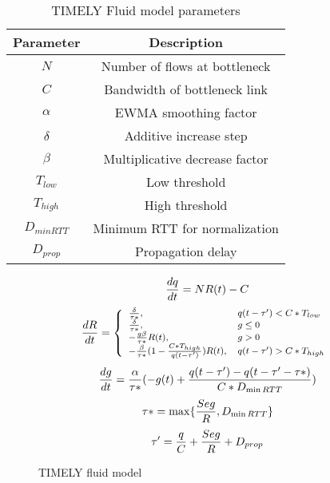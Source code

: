 \begin{table}[t]
\center
{
\footnotesize
{
\begin{tabular}{|c|c|} \hline
Parameter & Description \\ \hline
$N$ & Number of flows at bottleneck\\ \hline
$C$ & Bandwidth of bottleneck link\\ \hline
$\alpha$ & EWMA smoothing factor\\ \hline
$\delta$ & Additive increase step\\ \hline
$\beta$ & Multiplicative decrease factor\\ \hline
$T_{low}$ & Low threshold\\ \hline
$T_{high}$ & High threshold\\ \hline
$D_{minRTT}$ & Minimum RTT for normalization \\ \hline
$D_{prop}$ & Propagation delay \\ \hline
\end{tabular}
}
}
\caption{TIMELY Fluid model parameters}
\label{tab:timely_param}
\end{table}

\begin{figure}[h]
\fbox
{
\begin{minipage}{\columnwidth}
\begin{equation}
\small
\frac{{dq}}{{dt}} = NR(t) - C\\
\label{eq:timely_q}
\end{equation}
\begin{equation}
\small
\frac{{dR}}{{dt}} = \left\{ \begin{array}{ll}
\frac{\delta }{{\tau *}}, & q(t - \tau ') < C*{T_{low}}\\
\frac{\delta }{{\tau *}}, & g \le 0\\
 - \frac{{g\beta }}{{\tau *}}R(t), & g > 0\\
 - \frac{\beta }{{\tau *}}(1 - \frac{{C*{T_{high}}}}{{q(t - \tau ')}})R(t), & q(t - \tau ') > C*{T_{high}}
\end{array} \right.\\
\label{eq:timely_r}
\end{equation}
\begin{equation}
\small
\frac{{dg}}{{dt}} = \frac{\alpha }{{\tau *}}( - g(t) + \frac{{q(t - \tau ') - q(t - \tau ' - \tau *)}}{{C*{D_{\min RTT}}}})\\
\label{eq:timely_g}
\end{equation}
\begin{equation}
\small
\tau * = \max \{ \frac{{Seg}}{R},{D_{\min RTT}}\} \\
\label{eq:timely_taus}
\end{equation}
\begin{equation}
\small
\tau ' = \frac{q}{C} + \frac{{Seg}}{R} + {D_{prop}}
\label{eq:timely_taup}
\end{equation}
\end{minipage}
}
\caption{TIMELY fluid model}
\label{fig:timely_model}
\end{figure}

